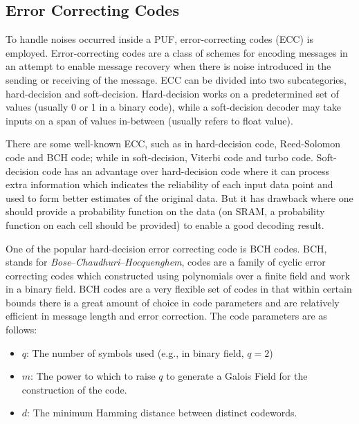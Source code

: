 \subsection{Error Correcting Codes}
To handle noises occurred inside a PUF, error-correcting codes (ECC) is employed.
Error-correcting codes are a class of schemes for encoding messages in an attempt to enable message recovery when there is noise introduced in the sending or receiving of the message. ECC can be divided into two subcategories, hard-decision and soft-decision. Hard-decision works on a predetermined set of values (usually 0 or 1 in a binary code), while a soft-decision decoder may take inputs on a span of values in-between (usually refers to float value).

There are some well-known ECC, such as in hard-decision code, Reed-Solomon code and BCH code; while in soft-decision, Viterbi code and turbo code. Soft-decision code has an advantage over hard-decision code where it can process extra information which indicates the reliability of each input data point and used to form better estimates of the original data. But it has drawback where one should provide a probability function on the data (on SRAM, a probability function on each cell should be provided) to enable a good decoding result.

One of the popular hard-decision error correcting code is BCH codes. BCH, stands for \textit{Bose}–\textit{Chaudhuri}–\textit{Hocquenghem}, codes are a family of cyclic error correcting codes which constructed using polynomials over a finite field and work in a binary field.
BCH codes are a very flexible set of codes in that within certain bounds there is a great amount of choice in code parameters and are relatively efficient in message length and error correction. The code parameters are as follows:
\begin{itemize}
\item $q$: The number of symbols used (e.g., in binary field, $q = 2$)
\item $m$: The power to which to raise $q$ to generate a Galois Field for the construction of the code.
\item $d$: The minimum Hamming distance between distinct codewords.
\end{itemize}

